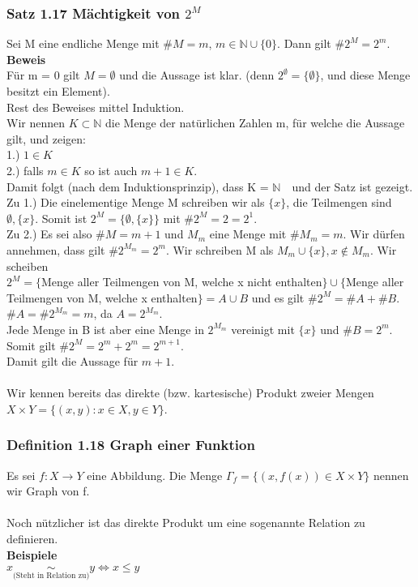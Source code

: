 \documentclass{report}
\newcommand{\N}{\mathbb{N}}
\newcommand{\mN}{$\mathbb{N}$\ }
\theoremstyle{customrem}
\theoremstyle{customdef}
\begin{document}
\subsubsection{Satz 1.17 Mächtigkeit von $2^M$}
Sei M eine endliche Menge mit $\#M = m$, $m \in \N \cup \{0\}$. Dann gilt $\#2^M = 2^m$.\\
\textbf{Beweis}\\
Für m = 0 gilt $M = \emptyset$ und die Aussage ist klar. (denn $2^\emptyset = \{\emptyset\}$, und diese Menge besitzt ein Element).\\
Rest des Beweises mittel Induktion.\\
Wir nennen $K \subset \N$ die Menge der natürlichen Zahlen m, für welche die Aussage gilt, und zeigen:\\
1.) $1 \in K$\\
2.) falls $m \in K$ so ist auch $m + 1 \in K$.\\
Damit folgt (nach dem Induktionsprinzip), dass  K = \mN\ und der Satz ist gezeigt.\\
Zu 1.) Die einelementige Menge M schreiben wir als $\{x\}$, die Teilmengen sind $\emptyset, \{x\}$. Somit ist $2^M = \{\emptyset, \{x\}\}$ mit $\#2^M = 2 = 2^1$.\\
Zu 2.) Es sei also $\#M = m + 1$  und $M_m$ eine Menge mit $\# M_m = m$. Wir dürfen annehmen, dass gilt $\#2^{M_m} = 2^m$. Wir schreiben M als $M_m \cup \{x\}, x \not\in M_m$. Wir scheiben\\
$2^M = \{$Menge aller Teilmengen von M, welche x nicht enthalten$\} \cup \{$Menge aller Teilmengen von M, welche x enthalten$\} = A \cup B$ und es gilt $\#2^M = \#A + \#B$.\\
$\#A = \#2^{M_m} = m$, da $A = 2^{M_m}$.\\
Jede Menge in B ist aber eine Menge in $2^{M_m}$ vereinigt mit $\{x\}$ und $\#B = 2^m$. Somit gilt $\#2^M = 2^m + 2^m = 2^{m + 1}$.\\
Damit gilt die Aussage für $m + 1$.\\
\\
Wir kennen bereits das direkte (bzw. kartesische) Produkt zweier Mengen $X \times Y = \{(x, y) : x\in X, y \in Y\}$.\\

\subsubsection{Definition 1.18 Graph einer Funktion}
Es sei $f : X \to Y$ eine Abbildung. Die Menge $\Gamma_f = \{(x, f(x)) \in X \times Y\}$ nennen wir Graph von f.\\
\\
Noch nützlicher ist das direkte Produkt um eine sogenannte Relation zu definieren.\\
\textbf{Beispiele}\\
$x \underset{\text{(Steht in Relation zu)}}{\sim} y \Leftrightarrow x \le y$\\
\end{document}
